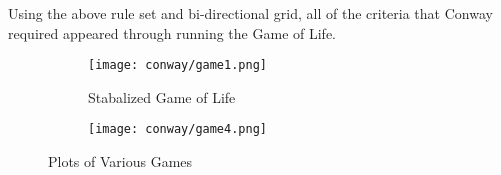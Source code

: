 Using the above rule set and bi-directional grid, all of the criteria that Conway required appeared through running the Game of Life.

\begin{figure}[tbh]
\begin{center}
    \begin{subfigure}[tbh]{0.475\textwidth}
    \begin{center}
    \texttt{[image: conway/game1.png]}
    \caption{ Stabalized Game of Life }
    \end{center}
    \end{subfigure}
\hfill
    \begin{subfigure}[tbh]{0.475\textwidth}
    \begin{center}
    \texttt{[image: conway/game4.png]}
    \end{center}
    \end{subfigure}
\hfill
\end{center}
\caption{Plots of Various Games \label{conway} }
\end{figure}
